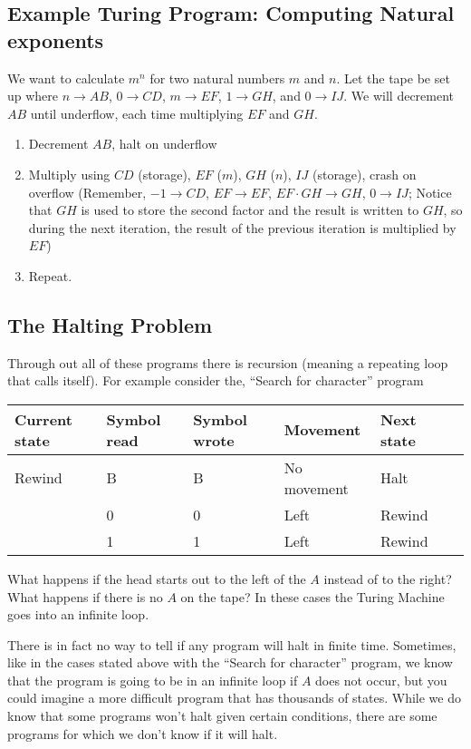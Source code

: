 \documentclass[11pt, letterpaper, twoside, openright]{book}
\begin{document}
\subsection{Example Turing Program: Computing Natural exponents}
We want to calculate $m^n$ for two natural numbers $m$ and $n$. Let the tape be set up where $n \to AB$, $0 \to CD$, $m \to EF$, $1 \to GH$, and $0 \to IJ$. We will decrement $AB$ until underflow, each time multiplying $EF$ and $GH$.

\begin{enumerate}
\item Decrement $AB$, halt on underflow
\item Multiply using $CD$ (storage), $EF$ ($m$), $GH$ ($n$), $IJ$ (storage), crash on overflow (Remember, $-1 \to CD$, $EF \to EF$, $EF \cdot GH \to GH$, $0 \to IJ$; Notice that $GH$ is used to store the second factor and the result is written to $GH$, so during the next iteration, the result of the previous iteration is multiplied by $EF$)
\item Repeat.
\end{enumerate}

\subsection{The Halting Problem}
Through out all of these programs there is recursion (meaning a repeating loop that calls itself). For example consider the, ``Search for character'' program
 
\begin{tabular}{|l|l|l|l|l|l|}
\hline
Current state & Symbol read & Symbol wrote & Movement & Next state \\
\hline
Rewind & B & B & No movement & Halt \\
 & 0 & 0 & Left & Rewind \\
 & 1 & 1 & Left & Rewind \\
\hline
\end{tabular}

What happens if the head starts out to the left of the $A$ instead of to the right? What happens if there is no $A$ on the tape? In these cases the Turing Machine goes into an infinite loop.

There is in fact no way to tell if any program will halt in finite time. Sometimes, like in the cases stated above with the ``Search for character'' program, we know that the program is going to be in an infinite loop if $A$ does not occur, but you could imagine a more difficult program that has thousands of states. While we do know that some programs won't halt given certain conditions, there are some programs for which we don't know if it will halt.
\end{document}
